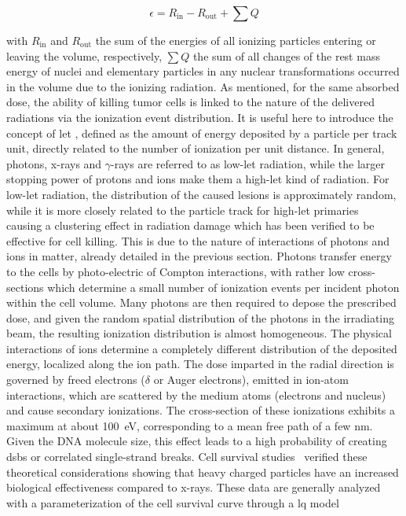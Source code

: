 \begin{equation}
\epsilon = R_{\mathrm{in}} - R_{\mathrm{out}} + \sum{Q}
\label{chap1::eq::impEnergyDef}
\end{equation}

with $R_{\mathrm{in}}$ and $R_{\mathrm{out}}$ the sum of the energies of all ionizing particles entering or leaving the volume, respectively, $ \sum{Q}$ the sum of all changes of the rest mass energy of nuclei and elementary particles in any nuclear transformations occurred in the volume due to the ionizing radiation.
As mentioned, for the same absorbed dose, the ability of killing tumor cells is linked to the nature of the delivered radiations via the ionization event distribution. It is useful here to introduce the concept of \gls{let} , defined as the amount of energy deposited by a particle per track unit, directly related to the number of ionization per unit distance. In general, photons, x-rays and $\gamma$-rays are referred to as low-\gls{let} radiation, while the larger stopping power of protons and ions make them a high-\gls{let} kind of radiation. For low-\gls{let} radiation, the distribution of the caused lesions is approximately random, while it is more closely related to the particle track for high-\gls{let} primaries~\parencite{Lobrich1996} causing a clustering effect in radiation damage which has been verified to be effective for cell killing\parencite{Holley1996, Rydberg1996}. This is due to the nature of interactions of photons and ions in matter, already detailed in the previous section. 
Photons transfer energy to the cells by photo-electric of Compton interactions, with rather low cross-sections which determine a small number of ionization events per incident photon within the cell volume. Many photons are then required to depose the prescribed dose, and given the random spatial distribution of the photons in the irradiating beam, the resulting ionization distribution is almost homogeneous. The physical interactions of ions determine a completely different distribution of the deposited energy, localized along the ion path. The dose imparted in the radial direction is governed by freed electrons ($\delta$ or Auger electrons), emitted in ion-atom interactions, which are scattered by the medium atoms (electrons and nucleus) and cause secondary ionizations. The cross-section of these ionizations exhibits a maximum at about 100~eV, corresponding to a mean free path of a few nm. Given the DNA molecule size, this effect leads to a high probability of creating \glspl{dsb} or correlated single-strand breaks. %
Cell survival studies~\parencite{Tobias1982, Blakely1984} verified these theoretical considerations showing that heavy charged particles have an increased biological effectiveness compared to x-rays. These data are generally analyzed with a parameterization of the cell survival curve through a \gls{lq} model~\parencite{Hall2012}

